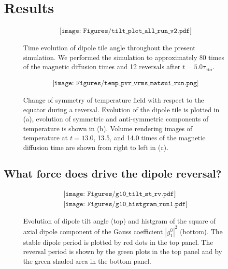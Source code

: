 \section{Results}

%
\begin{figure}[ht]
\begin{center}
\[
\begin{array}{c}
\texttt{[image: Figures/tilt\_plot\_all\_run\_v2.pdf]}
\end{array}
\]
\end{center}
\caption{
Time evolution of dipole tile angle throughout the present simulation. We performed the simulation to approximately 80 times of the magnetic diffusion times and 12 reversals after $t = 5.0 \tau_{eta}$.}
\label{Fig:Change_flux_summary_6grp}
\end{figure}
%
%
\begin{figure}[ht]
\begin{center}
\[
\begin{array}{c}
\texttt{[image: Figures/temp\_pvr\_vrms\_matsui\_run.png]}
\end{array}
\]
\end{center}
\caption{
Change of symmetry of temperature field with respect to the equator during a reversal. Evolution of the dipole tile is plotted in (a), evolution of symmetric and anti-symmetric components of temperature is shown in (b). Volume rendering images of temperature at $t = 13.0$, 13.5, and 14.0 times of the magnetic diffusion time are shown from right to left in (c).
}
\label{Fig:Change_flux_summary_6grp}
\end{figure}
%

\subsection{What force does drive the dipole reversal?}

%
\begin{figure}[ht]
\begin{center}
\[
\begin{array}{c}
\texttt{[image: Figures/g10\_tilt\_st\_rv.pdf]} \\
\texttt{[image: Figures/g10\_histgram\_run1.pdf]}
\end{array}
\]
\end{center}
\caption{
Evolution of dipole tilt angle (top) and histgram of the square of axial dipole component of the Gauss coefficient $|g_{1}^{0}|^2$ (bottom). The stable dipole period is plotted by red dots in the top panel. The reversal period is shown by the green plots in the top panel and by the green shaded area in the bottom panel.
}
\label{Fig:REversal_period_def}
\end{figure}
%


